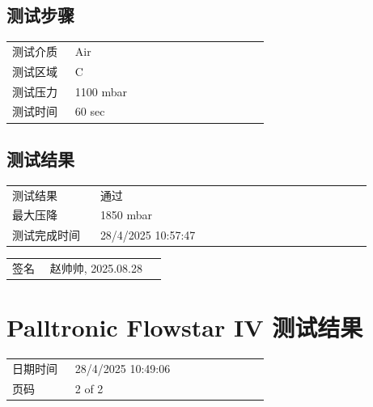 \documentclass[UTF8,10pt,a4paper,fontset=fandol]{ctexart}
\newcommand{\fieldvalue}[1]{#1}
\newcommand{\handwritten}[1]{#1}
\begin{document}
\subsection{测试步骤}

\begin{tabular}{@{}p{0.22\linewidth}p{0.68\linewidth}@{}}
测试介质 &
\fieldvalue{Air} \\
测试区域 &
\fieldvalue{C} \\
测试压力 &
\fieldvalue{1100 mbar} \\
测试时间 &
\fieldvalue{60 sec} \\
\end{tabular}

\subsection{测试结果}

\begin{tabular}{@{}p{0.22\linewidth}p{0.68\linewidth}@{}}
测试结果 &
\fieldvalue{通过} \\
最大压降 &
\fieldvalue{1850 mbar} \\
测试完成时间 &
\fieldvalue{28/4/2025 10:57:47} \\
\end{tabular}

\vspace{1em}

\begin{tabular}{@{}p{0.22\linewidth}p{0.68\linewidth}@{}}
签名 &
\fieldvalue{\handwritten{赵帅帅, 2025.08.28}} \\
\end{tabular}

\section{Palltronic Flowstar IV 测试结果}

\begin{tabular}{@{}p{0.22\linewidth}p{0.68\linewidth}@{}}
日期时间 &
\fieldvalue{28/4/2025 10:49:06} \\
页码 &
\fieldvalue{2 of 2} \\
\end{tabular}
\end{document}
